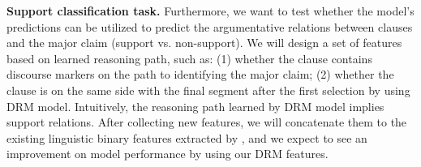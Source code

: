 
\textbf{Support classification task.}  Furthermore, we want to test whether the model's predictions can be utilized to predict the argumentative relations between clauses and the major claim (support vs. non-support). We will design a set of features based on learned reasoning path, such as: (1) whether the clause contains discourse markers on the path to identifying the major claim; (2) whether the clause is on the same side with the final segment after the first selection by using DRM model. Intuitively, the reasoning path learned by DRM model implies support relations. After collecting new features, we will concatenate them to the existing linguistic binary features extracted by \cite{DBLP:conf/emnlp/StabG14}, and we expect to see an improvement on model performance by using our DRM features.